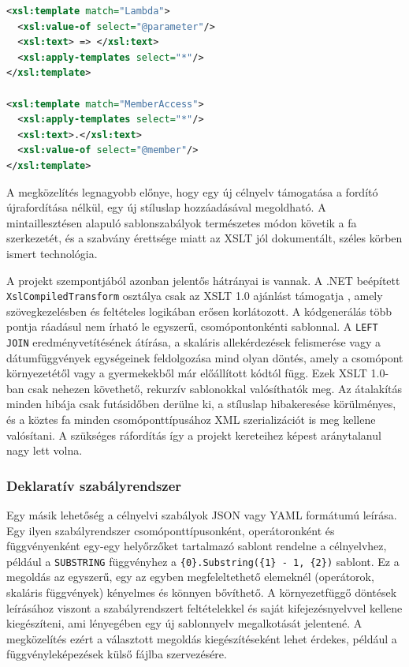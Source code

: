 \documentclass[a4paper,12pt]{article}
\begin{document}
\newpage

\begin{lstlisting}[language=XML, caption={XSLT sablonszabályok egy lambda kifejezés és egy tagelérés generálására}, label={lst:xslt}]
<xsl:template match="Lambda">
  <xsl:value-of select="@parameter"/>
  <xsl:text> => </xsl:text>
  <xsl:apply-templates select="*"/>
</xsl:template>

<xsl:template match="MemberAccess">
  <xsl:apply-templates select="*"/>
  <xsl:text>.</xsl:text>
  <xsl:value-of select="@member"/>
</xsl:template>
\end{lstlisting}

A megközelítés legnagyobb előnye, hogy egy új célnyelv támogatása a fordító újrafordítása nélkül, egy új stíluslap hozzáadásával megoldható. A mintaillesztésen alapuló sablonszabályok természetes módon követik a fa szerkezetét, és a szabvány érettsége miatt az XSLT jól dokumentált, széles körben ismert technológia.

A projekt szempontjából azonban jelentős hátrányai is vannak. A .NET beépített \texttt{XslCompiledTransform} osztálya csak az XSLT 1.0 ajánlást támogatja \cite{mslearn2024xslt}, amely szövegkezelésben és feltételes logikában erősen korlátozott. A kódgenerálás több pontja ráadásul nem írható le egyszerű, csomópontonkénti sablonnal. A \texttt{LEFT JOIN} eredményvetítésének átírása, a skaláris allekérdezések felismerése vagy a dátumfüggvények egységeinek feldolgozása mind olyan döntés, amely a csomópont környezetétől vagy a gyermekekből már előállított kódtól függ. Ezek XSLT 1.0-ban csak nehezen követhető, rekurzív sablonokkal valósíthatók meg. Az átalakítás minden hibája csak futásidőben derülne ki, a stíluslap hibakeresése körülményes, és a köztes fa minden csomóponttípusához XML szerializációt is meg kellene valósítani. A szükséges ráfordítás így a projekt kereteihez képest aránytalanul nagy lett volna.

\subsubsection{Deklaratív szabályrendszer}

Egy másik lehetőség a célnyelvi szabályok JSON vagy YAML formátumú leírása. Egy ilyen szabályrendszer csomóponttípusonként, operátoronként és függvényenként egy-egy helyőrzőket tartalmazó sablont rendelne a célnyelvhez, például a \texttt{SUBSTRING} függvényhez a \texttt{\{0\}.Substring(\{1\} - 1, \{2\})} sablont. Ez a megoldás az egyszerű, egy az egyben megfeleltethető elemeknél (operátorok, skaláris függvények) kényelmes és könnyen bővíthető. A környezetfüggő döntések leírásához viszont a szabályrendszert feltételekkel és saját kifejezésnyelvvel kellene kiegészíteni, ami lényegében egy új sablonnyelv megalkotását jelentené. A megközelítés ezért a választott megoldás kiegészítéseként lehet érdekes, például a függvényleképezések külső fájlba szervezésére.
\end{document}
